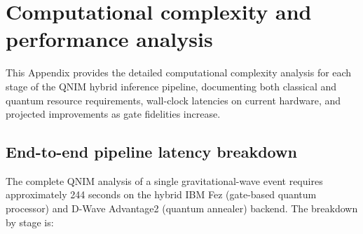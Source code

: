 \documentclass[11pt,a4paper, english]{book}
\theoremstyle{plain}
\theoremstyle{definition}
\numberwithin{equation}{chapter}
\numberwithin{figure}{chapter}
\numberwithin{table}{chapter}
\begin{document}

\chapter{Computational complexity and performance analysis}
\label{app:complexity-table}

This Appendix provides the detailed computational complexity analysis for each 
stage of the QNIM hybrid inference pipeline, documenting both classical and 
quantum resource requirements, wall-clock latencies on current hardware, and 
projected improvements as gate fidelities increase.

\section{End-to-end pipeline latency breakdown}

The complete QNIM analysis of a single gravitational-wave event requires 
approximately 244 seconds on the hybrid IBM Fez (gate-based quantum processor) 
and D-Wave Advantage2 (quantum annealer) backend. The breakdown by stage is:

\begin{table}[ht]
\centering
\small

\caption[Latency and resources per pipeline stage]{Wall-clock latency and resource requirements per pipeline stage 
         (single event, IBM Fez + D-Wave A2). Source: own elaboration.}
\label{tab:pipeline-latency}
\normalsize
\end{table}
\end{document}
